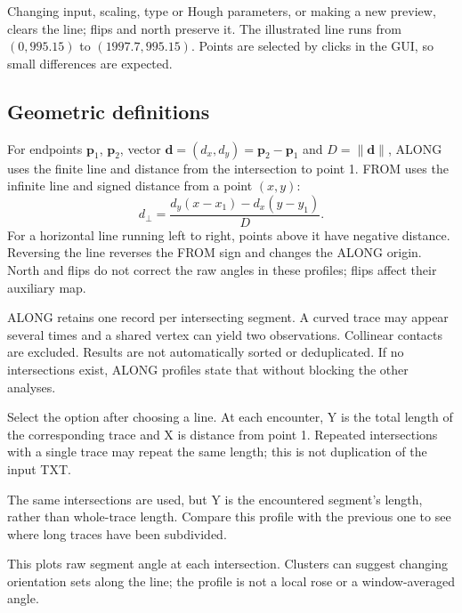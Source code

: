 Changing input, scaling, type or Hough parameters, or making a new preview, clears the line; flips and north preserve it. The illustrated line runs from \((0,995.15)\) to \((1997.7,995.15)\). Points are selected by clicks in the GUI, so small differences are expected.

\subsection{Geometric definitions}
For endpoints \(\mathbf p_1\), \(\mathbf p_2\), vector \(\mathbf d=(d_x,d_y)=\mathbf p_2-\mathbf p_1\) and \(D=\|\mathbf d\|\), ALONG uses the finite line and distance from the intersection to point 1. FROM uses the infinite line and signed distance from a point \((x,y)\):
\begin{equation}
d_\perp=\frac{d_y(x-x_1)-d_x(y-y_1)}{D}.
\end{equation}
For a horizontal line running left to right, points above it have negative distance. Reversing the line reverses the FROM sign and changes the ALONG origin. North and flips do not correct the raw angles in these profiles; flips affect their auxiliary map.

ALONG retains one record per intersecting segment. A curved trace may appear several times and a shared vertex can yield two observations. Collinear contacts are excluded. Results are not automatically sorted or deduplicated. If no intersections exist, ALONG profiles state that without blocking the other analyses.

Select the option after choosing a line. At each encounter, Y is the total length of the corresponding trace and X is distance from point 1. Repeated intersections with a single trace may repeat the same length; this is not duplication of the input TXT.

The same intersections are used, but Y is the encountered segment's length, rather than whole-trace length. Compare this profile with the previous one to see where long traces have been subdivided.

This plots raw segment angle at each intersection. Clusters can suggest changing orientation sets along the line; the profile is not a local rose or a window-averaged angle.

